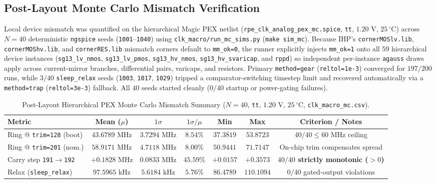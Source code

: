 \documentclass[10pt,a4paper]{article}
\begin{document}
\subsection{Post-Layout Monte Carlo Mismatch Verification}
\label{sec:mc}
Local device mismatch was quantified on the hierarchical Magic PEX netlist (\texttt{rpe\_clk\_analog\_pex\_mc.spice}, \texttt{tt}, $1.20\text{ V}$, $25\,^\circ\text{C}$) across $N=40$ deterministic \texttt{ngspice} seeds (\texttt{1001}--\texttt{1040}) using \texttt{clk\_macro/run\_mc\_sims.py} (\texttt{make sim\_mc}). Because IHP's \texttt{cornerMOSlv.lib}, \texttt{cornerMOShv.lib}, and \texttt{cornerRES.lib} mismatch corners default to \texttt{mm\_ok=0}, the runner explicitly injects \texttt{mm\_ok=1} onto all $59$ hierarchical device instances (\texttt{sg13\_lv\_nmos}, \texttt{sg13\_lv\_pmos}, \texttt{sg13\_hv\_nmos}, \texttt{sg13\_hv\_svaricap}, and \texttt{rppd}) so independent per-instance \texttt{agauss} draws apply across current-mirror branches, differential pairs, varicaps, and resistors. Primary \texttt{method=gear} (\texttt{reltol=1e-3}) converged for $197/200$ runs, while $3/40$ \texttt{sleep\_relax} seeds (\texttt{1003}, \texttt{1017}, \texttt{1029}) tripped a comparator-switching timestep limit and recovered automatically via a \texttt{method=trap} (\texttt{reltol=3e-3}) fallback. All $40$ seeds started cleanly ($0/40$ startup or power-gating failures).

\begin{table}[H]
\centering
\caption{Post-Layout Hierarchical PEX Monte Carlo Mismatch Summary ($N=40$, \texttt{tt}, $1.20\text{ V}$, $25\,^\circ\text{C}$, \texttt{clk\_macro\_mc.csv}).}
\label{tab:mc_summary}
\small
\begin{tabular}{@{}lcccccc@{}}
\toprule
\textbf{Metric} & \textbf{Mean ($\mu$)} & \textbf{$1\sigma$} & \textbf{$1\sigma / \mu$} & \textbf{Min} & \textbf{Max} & \textbf{Criterion / Notes} \\
\midrule
Ring @ \texttt{trim=128} (boot) & $43.6789\text{ MHz}$ & $3.7294\text{ MHz}$ & $8.54\%$ & $37.3819$ & $53.8723$ & $40/40 \le 60\text{ MHz}$ ceiling \\
Ring @ \texttt{trim=201} (nom.) & $58.9171\text{ MHz}$ & $4.7118\text{ MHz}$ & $8.00\%$ & $50.9441$ & $71.7147$ & On-chip trim compensates spread \\
Carry step \texttt{191}$\to$\texttt{192} & $+0.1828\text{ MHz}$ & $0.0833\text{ MHz}$ & $45.59\%$ & $+0.0157$ & $+0.3573$ & \textbf{$40/40$ strictly monotonic ($>0$)} \\
Relax (\texttt{sleep\_relax}) & $97.5965\text{ kHz}$ & $5.6184\text{ kHz}$ & $5.76\%$ & $86.4789$ & $110.1094$ & $0/40$ gated-output violations \\
\bottomrule
\end{tabular}
\end{table}
\end{document}

